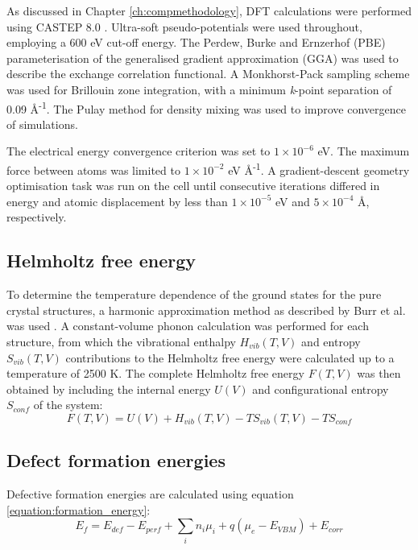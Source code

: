 As discussed in Chapter \ref{ch:compmethodology}, DFT calculations were performed using CASTEP 8.0 \cite{Clark2005}. Ultra-soft pseudo-potentials were used throughout, employing a 600 eV cut-off energy. The Perdew, Burke and Ernzerhof (PBE) \cite{Perdew1996} parameterisation of the generalised gradient approximation (GGA) was used to describe the exchange correlation functional. A Monkhorst-Pack sampling scheme \cite{Monkhorst1976} was used for Brillouin zone integration, with a minimum \emph{k}-point separation of 0.09 \r{A}\textsuperscript{-1}. The Pulay method for density mixing \cite{Pulay1980} was used to improve convergence of simulations. 

The electrical energy convergence criterion was set to $1\times10^{-6} $ eV. The maximum force between atoms was limited to $1\times10^{-2}$ eV \r{A}\textsuperscript{-1}. A gradient-descent geometry optimisation task was run on the cell until consecutive iterations differed in energy and atomic displacement by less than $1\times10^{-5}$ eV and $5\times10^{-4}$ \r{A}, respectively. 


\subsection{Helmholtz free energy}

To determine the temperature dependence of the ground states for the pure crystal structures, a harmonic approximation method as described by Burr et al. was used \cite{burr2015crystal,jackson2016resolving}. A constant-volume phonon calculation was performed for each structure, from which the vibrational enthalpy $H_{vib}(T, V)$ and entropy $S_{vib}(T, V)$ contributions to the Helmholtz free energy were calculated up to a temperature of 2500 K. The complete Helmholtz free energy $F(T, V)$ was then obtained by including the internal energy $U(V)$ and configurational entropy $S_{conf}$ of the system:
\begin{equation} \label{helmholtz_equation}
F(T, V) = U(V) + H_{vib}(T, V) - TS_{vib}(T, V) - TS_{conf}
\end{equation}

\subsection{Defect formation energies}

Defective formation energies are calculated using equation \ref{equation:formation_energy}:
\begin{equation} \label{equation:formation_energy}
    E_{f} = E_{def} - E_{perf} + \sum_{i} n_i\mu_i + q(\mu_{e} - E_{VBM}) + E_{corr}
\end{equation}

